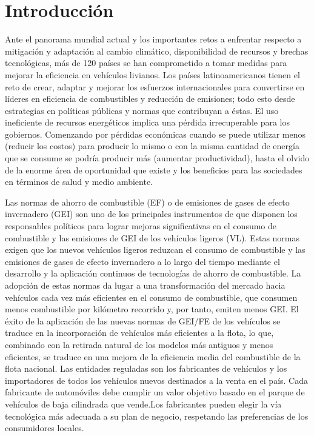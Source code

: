\chapter{Introducción}

Ante el panorama mundial actual y los importantes retos a enfrentar respecto a mitigación y adaptación al cambio climático, disponibilidad de recursos y brechas tecnológicas, más de 120 países se han comprometido a tomar medidas para mejorar la eficiencia en vehículos livianos. Los países latinoamericanos tienen el reto de crear, adaptar y mejorar los esfuerzos internacionales para convertirse en líderes en eficiencia de combustibles y reducción de emisiones; todo esto desde estrategias en políticas públicas y normas que contribuyan a éstas. El uso ineficiente de recursos energéticos implica una pérdida irrecuperable para los gobiernos. Comenzando por pérdidas económicas cuando se puede utilizar menos (reducir los costos) para producir lo mismo o con la misma cantidad de energía que se consume se podría producir más (aumentar productividad), hasta el olvido de la enorme área de oportunidad que existe y los beneficios para las sociedades en términos de salud y medio ambiente.

Las normas de ahorro de combustible (EF) o de emisiones de gases de efecto invernadero (GEI) son uno de los principales instrumentos de que disponen los responsables políticos para lograr mejoras significativas en el consumo de combustible y las emisiones de GEI de los vehículos ligeros (VL). Estas normas exigen que los nuevos vehículos ligeros reduzcan el consumo de combustible y las emisiones de gases de efecto invernadero a lo largo del tiempo mediante el desarrollo y la aplicación continuos de tecnologías de ahorro de combustible. La adopción de estas normas da lugar a una transformación del mercado hacia vehículos cada vez más eficientes en el consumo de combustible, que consumen menos combustible por kilómetro recorrido y, por tanto, emiten menos GEI. \cite{FESET_ICCT}
El éxito de la aplicación de las nuevas normas de GEI/FE de los vehículos se traduce en la incorporación de vehículos más eficientes a la flota, lo que, combinado con la retirada natural de los modelos más antiguos y menos eficientes, se traduce en una mejora de la eficiencia media del combustible de la flota nacional. Las entidades reguladas son los fabricantes de vehículos y los importadores de todos los vehículos nuevos destinados a la venta en el país. Cada fabricante de automóviles debe cumplir un valor objetivo basado en el parque de vehículos de baja cilindrada que vende.Los fabricantes pueden elegir la vía tecnológica más adecuada a su plan de negocio, respetando las preferencias de los consumidores locales.

